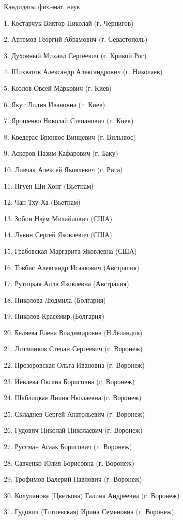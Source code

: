                      Кандидаты физ.-мат. наук

1.	Костарчук Виктор Николай (г. Чернигов)

2.	Артемов Георгий Абрамович (г. Севастополь)

3.	Духовный Михаил Сергеевич (г. Кривой Рог)

4.	Шихватов Александр Александрович (г. Николаев)

5.	Козлов Овсей Маркович (г. Киев)

6.	Якут Лидия Ивановна (г. Киев)

7.	Ярошенко Николай Степанович (г. Киев)

8.	Кведерас Брюнюс Винцевич (г. Вильнюс)

9.	Аскеров Назим Кафарович (г. Баку)

10.	Ливчак Алексей Яковлевич (г. Рига)

11.	Нгуен Ши Хонг   (Вьетнам)

12.	Чан Тху Ха (Вьетнам)

13.	Зобин Наум Михайлович (США)

14.	Львин Сергей Яковлевич (США)

15.	Грабовская Маргарита Яковлевна (США)

16.	Товбис Александр Исаакович (Австралия)

17.	Рутицкая Алла Яковлевна (Австралия)

18.	Николова Людмила (Болгария)

19.	Николов Красемир (Болгария)

20.	Беляева Елена Владимировна (Н.Зеландия)

21.	Литминков Степан Сергеевич (г. Воронеж)


22.	Прозоровская Ольга Ивановна (г. Воронеж)

23.	Иевлева Оксана Борисовна (г. Воронеж)

24.	Шаблицкая Лилия Нколаевна (г. Воронеж)

25.	Складнев Сергей Анатольевич (г. Воронеж)

26.	Гудович Николай Николаевич (г. Воронеж)

27.	Руссман Асаак Борисович (г. Воронеж)

28.	Савченко Юлия Борисовна (г. Воронеж)

29.	Трофимов Валерий Павлович (г. Воронеж)

30.	Колупанова (Цветкова) Галина Андреевна (г. Воронеж)

31.	Гудович (Титиевская) Ирина Семеновна (г. Воронеж)

